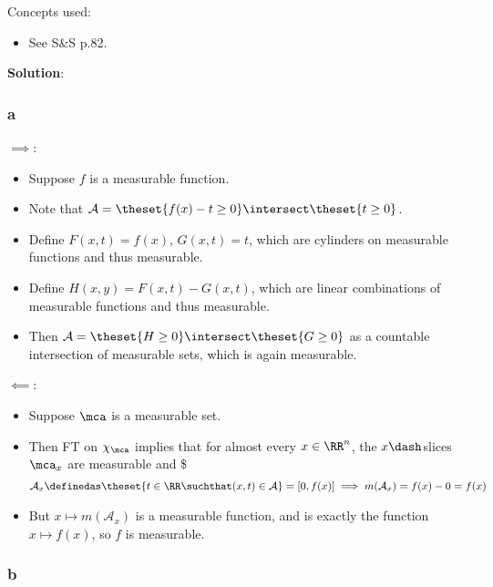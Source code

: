 \begin{solution}

Concepts used:

\begin{itemize}
\tightlist
\item
  See S\&S p.82.
\end{itemize}

\textbf{Solution}:

\hypertarget{a-15}{%
\subsubsection{a}\label{a-15}}

\(\implies\):

\begin{itemize}
\tightlist
\item
  Suppose \(f\) is a measurable function.
\item
  Note that
  \(\mathcal{A} = \theset{f(x) - t \geq 0} \intersect \theset{t \geq 0}\).
\item
  Define \(F(x, t) = f(x)\), \(G(x, t) = t\), which are cylinders on
  measurable functions and thus measurable.
\item
  Define \(H(x, y) = F(x, t) - G(x, t)\), which are linear combinations
  of measurable functions and thus measurable.
\item
  Then \(\mathcal{A} = \theset{H \geq 0} \intersect \theset{G \geq 0}\)
  as a countable intersection of measurable sets, which is again
  measurable.
\end{itemize}

\(\impliedby\):

\begin{itemize}
\item
  Suppose \(\mca\) is a measurable set.
\item
  Then FT on \(\chi_{\mca}\) implies that for almost every
  \(x\in \RR^n\), the \(x\dash\)slices \(\mca_x\) are measurable and \$
  \begin{align*}
  \mathcal{A}_x \definedas \theset{t\in \RR \suchthat (x, t) \in \mathcal{A}} = [0, f(x)] \implies m(\mathcal A_x) = f(x) - 0 = f(x)
  \end{align*}
\item
  But \(x \mapsto m(\mathcal A_x)\) is a measurable function, and is
  exactly the function \(x \mapsto f(x)\), so \(f\) is measurable.
\end{itemize}

\hypertarget{b-15}{%
\subsubsection{b}\label{b-15}}


\end{solution}
